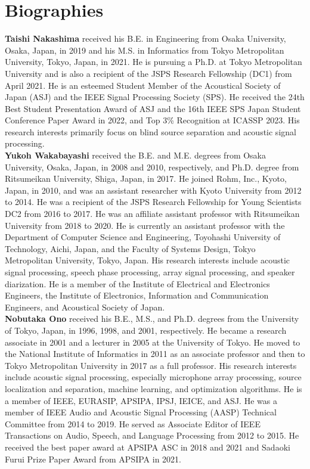 \documentclass[sip,biber]{now-journal}
\begin{document}
\section*{Biographies}

\noindent\normalsize\textbf{Taishi Nakashima}
received his B.E. in Engineering from Osaka University, Osaka, Japan, in 2019 and his M.S. in Informatics from Tokyo Metropolitan University, Tokyo, Japan, in 2021.
He is pursuing a Ph.D. at Tokyo Metropolitan University and is also a recipient of the JSPS Research Fellowship (DC1) from April 2021.
He is an esteemed Student Member of the Acoustical Society of Japan (ASJ) and the IEEE Signal Processing Society (SPS).
He received the 24th Best Student Presentation Award of ASJ and the 16th IEEE SPS Japan Student Conference Paper Award in 2022, and Top 3\% Recognition at ICASSP 2023.
His research interests primarily focus on blind source separation and acoustic signal processing.
\\

\noindent\normalsize\textbf{Yukoh Wakabayashi}
received the B.E. and M.E. degrees from Osaka University, Osaka, Japan, in 2008 and 2010, respectively, and Ph.D. degree from Ritsumeikan University, Shiga, Japan, in 2017.
He joined Rohm, Inc., Kyoto, Japan, in 2010, and was an assistant researcher with Kyoto University from 2012 to 2014.
He was a recipient of the JSPS Research Fellowship for Young Scientists DC2 from 2016 to 2017.
He was an affiliate assistant professor with Ritsumeikan University from 2018 to 2020.
He is currently an assistant professor with the Department of Computer Science and Engineering, Toyohashi University of Technology, Aichi, Japan, and the Faculty of Systems Design, Tokyo Metropolitan University, Tokyo, Japan.
His research interests include acoustic signal processing, speech phase processing, array signal processing, and speaker diarization.
He is a member of the Institute of Electrical and Electronics Engineers, the Institute of Electronics, Information and Communication Engineers, and Acoustical Society of Japan.
\\

\noindent\normalsize\textbf{Nobutaka Ono}
received his B.E., M.S., and Ph.D. degrees from the University of Tokyo, Japan, in 1996, 1998, and 2001, respectively.
He became a research associate in 2001 and a lecturer in 2005 at the University of Tokyo.
He moved to the National Institute of Informatics in 2011 as an associate professor and then to Tokyo Metropolitan University in 2017 as a full professor.
His research interests include acoustic signal processing, especially microphone array processing, source localization and separation, machine learning, and optimization algorithms.
He is a member of IEEE, EURASIP, APSIPA, IPSJ, IEICE, and ASJ.
He was a member of IEEE Audio and Acoustic Signal Processing (AASP) Technical Committee from 2014 to 2019.
He served as Associate Editor of IEEE Transactions on Audio, Speech, and Language Processing from 2012 to 2015.
He received the best paper award at APSIPA ASC in 2018 and 2021 and Sadaoki Furui Prize Paper Award from APSIPA in 2021.

\printbibliography
\end{document}
